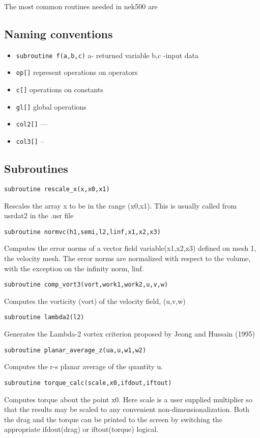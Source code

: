 The most common routines needed in nek500 are
\subsection{Naming conventions}
\begin{itemize}
\item  {\tt{subroutine f(a,b,c)}}
a- returned variable
b,c -input data
\item {\tt{op}[]} represent operations on operators
\item {\tt{c}[]}  operations on constants
\item {\tt{gl}[]} global operations
\item {\tt{col2}[]} ---
\item {\tt{col3}[]} --
\end{itemize}

\subsection{Subroutines}
{\tt subroutine rescale\_x(x,x0,x1)}

    Rescales the array x to be in the range (x0,x1). This is usually called from usrdat2 in the .usr file 
    
{\tt subroutine normvc(h1,semi,l2,linf,x1,x2,x3)}

    Computes the error norms of a vector field variable(x1,x2,x3) defined on mesh 1, the velocity mesh. The error norms are normalized with respect to the volume, with the exception on the infinity norm, linf. 
    
{\tt subroutine comp\_vort3(vort,work1,work2,u,v,w)}

    Computes the vorticity (vort) of the velocity field, (u,v,w) 
    
{\tt subroutine lambda2(l2)}

    Generates the Lambda-2 vortex criterion proposed by Jeong and Hussain (1995) 
    
{\tt subroutine planar\_average\_z(ua,u,w1,w2)}

    Computes the r-s planar average of the quantity u. 
    
{\tt subroutine torque\_calc(scale,x0,ifdout,iftout)}

    Computes torque about the point x0. Here scale is a user supplied multiplier so that the results may be scaled to any convenient non-dimensionalization. Both the drag and the torque can be printed to the screen by switching the appropriate ifdout(drag) or iftout(torque) logical. 
    
